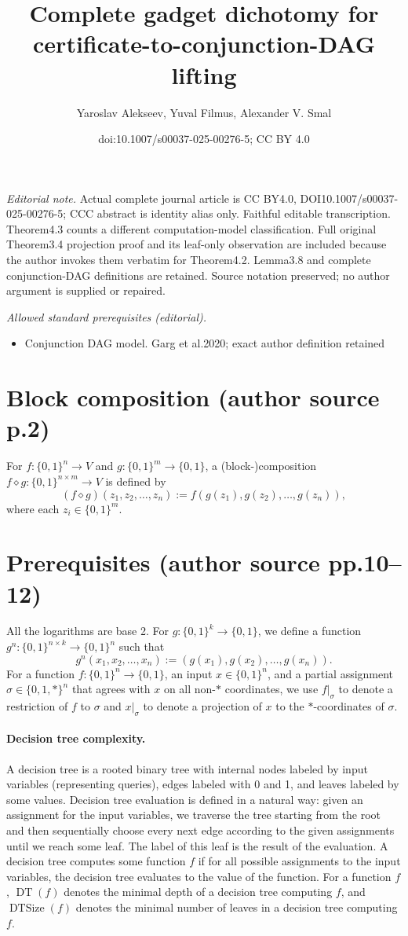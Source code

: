 \documentclass[10pt,a4paper]{article}
\title{Complete gadget dichotomy for certificate-to-conjunction-DAG lifting}
\author{Yaroslav Alekseev, Yuval Filmus, Alexander V. Smal}
\date{doi:10.1007/s00037-025-00276-5; CC BY 4.0}
\newcommand{\bits}{\{0,1\}}
\newcommand{\DT}{\operatorname{DT}}
\newcommand{\DTSize}{\operatorname{DTSize}}
\newcommand{\comp}{\diamond}
\begin{document}
\maketitle
\noindent\textit{Editorial note.} Actual complete journal article is CC BY4.0, DOI10.1007/s00037-025-00276-5; CCC abstract is identity alias only. Faithful editable transcription. Theorem4.3 counts a different computation-model classification. Full original Theorem3.4 projection proof and its leaf-only observation are included because the author invokes them verbatim for Theorem4.2. Lemma3.8 and complete conjunction-DAG definitions are retained. Source notation preserved; no author argument is supplied or repaired.\par\medskip
\noindent\textit{Allowed standard prerequisites (editorial).}\begin{itemize}
\item Conjunction DAG model. Garg et al.2020; exact author definition retained
\end{itemize}\medskip
\section*{Block composition (author source p.2)}
For $f:\bits^n\to V$ and $g:\bits^m\to\bits$, a (block-)composition $f\comp g:\bits^{n\times m}\to V$ is defined by
\[(f\comp g)(z_1,z_2,\ldots,z_n):=f(g(z_1),g(z_2),\ldots,g(z_n)),\]
where each $z_i\in\bits^m$.
\section*{Prerequisites (author source pp.10--12)}
All the logarithms are base 2. For $g:\bits^k\to\bits$, we define a function $g^n:\bits^{n\times k}\to\bits^n$ such that
\[g^n(x_1,x_2,\ldots,x_n):=(g(x_1),g(x_2),\ldots,g(x_n)).\]
For a function $f:\bits^n\to\bits$, an input $x\in\bits^n$, and a partial assignment $\sigma\in\{0,1,*\}^n$ that agrees with $x$ on all non-$*$ coordinates, we use $f|_\sigma$ to denote a restriction of $f$ to $\sigma$ and $x|_\sigma$ to denote a projection of $x$ to the $*$-coordinates of $\sigma$.
\paragraph{Decision tree complexity.} A decision tree is a rooted binary tree with internal nodes labeled by input variables (representing queries), edges labeled with 0 and 1, and leaves labeled by some values. Decision tree evaluation is defined in a natural way: given an assignment for the input variables, we traverse the tree starting from the root and then sequentially choose every next edge according to the given assignments until we reach some leaf. The label of this leaf is the result of the evaluation. A decision tree computes some function $f$ if for all possible assignments to the input variables, the decision tree evaluates to the value of the function. For a function $f$, $\DT(f)$ denotes the minimal depth of a decision tree computing $f$, and $\DTSize(f)$ denotes the minimal number of leaves in a decision tree computing $f$.
\end{document}
